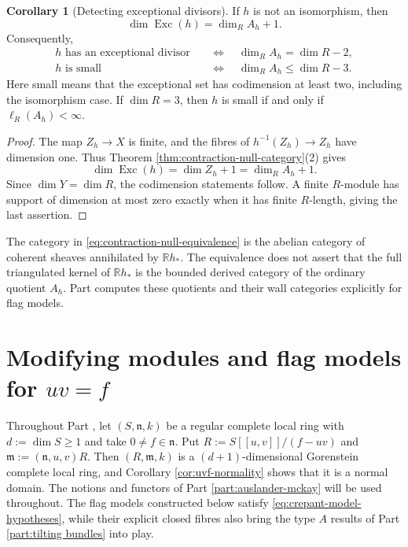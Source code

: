 \documentclass[a4paper,reqno]{amsart}
\def\m{\mathfrak{m}}
\def\n{\mathfrak{n}}
\theoremstyle{definition}
\newtheorem{Cor}[Thm]{Corollary}
\begin{document}
\begin{Cor}[Detecting exceptional divisors]\label{cor:contraction-algebra-dimension}
If $h$ is not an isomorphism, then
\begin{equation}\label{eq:contraction-algebra-dimension}
\dim\operatorname{Exc}(h)=\dim_R A_h+1.
\end{equation}
Consequently,
\[
\begin{aligned}
h\text{ has an exceptional divisor}
&\quad\Longleftrightarrow\quad \dim_R A_h=\dim R-2,\\
h\text{ is small}
&\quad\Longleftrightarrow\quad \dim_R A_h\le\dim R-3.
\end{aligned}
\]
Here small means that the exceptional set has codimension at least two, including the isomorphism case. If $\dim R=3$, then $h$ is small if and only if $\ell_R(A_h)<\infty$.
\end{Cor}
\begin{proof}
The map $Z_h\to X$ is finite, and the fibres of $h^{-1}(Z_h)\to Z_h$ have dimension one. Thus Theorem \ref{thm:contraction-null-category}(2) gives
\[
\dim\operatorname{Exc}(h)=\dim Z_h+1=\dim_R A_h+1.
\]
Since $\dim Y=\dim R$, the codimension statements follow. A finite $R$-module has support of dimension at most zero exactly when it has finite $R$-length, giving the last assertion.
\end{proof}

The category in \eqref{eq:contraction-null-equivalence} is the abelian category of coherent sheaves annihilated by $\mathbb Rh_*$. The equivalence does not assert that the full triangulated kernel of $\mathbb Rh_*$ is the bounded derived category of the ordinary quotient $A_h$. Part \ref{part:MM} computes these quotients and their wall categories explicitly for flag models.


\part{Modifying modules and flag models for \texorpdfstring{$uv=f$}{uv=f}}\label{part:MM}

Throughout Part \ref{part:MM}, let $(S,\n,k)$ be a regular complete local ring with $d:=\dim S\ge1$ and take $0\neq f\in\n$. Put $R:=S[[u,v]]/(f-uv)$ and $\m:=(\n,u,v)R$. Then $(R,\m,k)$ is a $(d+1)$-dimensional Gorenstein complete local ring, and Corollary \ref{cor:uvf-normality} shows that it is a normal domain. The notions and functors of Part \ref{part:auslander-mckay} will be used throughout. The flag models constructed below satisfy \eqref{eq:crepant-model-hypotheses}, while their explicit closed fibres also bring the type $A$ results of Part \ref{part:tilting bundles} into play.
\end{document}
